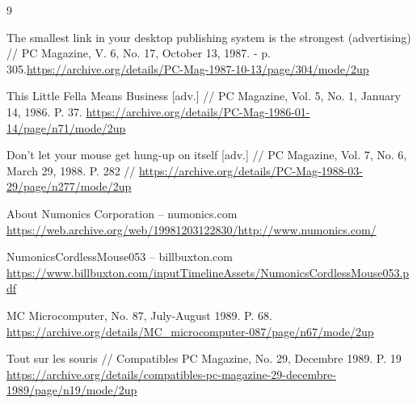 \documentclass[11pt, a4paper]{article}
\begin{document}
\begin{thebibliography}{9}

 The smallest link in your desktop publishing system is the strongest (advertising) // PC Magazine, V. 6, No. 17, October  13, 1987. - p. 305.\url{https://archive.org/details/PC-Mag-1987-10-13/page/304/mode/2up}

 This Little Fella Means Business [adv.] // PC Magazine, Vol. 5, No. 1, January 14, 1986. P. 37. \url{https://archive.org/details/PC-Mag-1986-01-14/page/n71/mode/2up}

 Don't let your mouse get hung-up on itself [adv.] // PC Magazine, Vol. 7, No. 6, March 29, 1988. P. 282 // \url{https://archive.org/details/PC-Mag-1988-03-29/page/n277/mode/2up}

 About Numonics Corporation -- numonics.com \url{https://web.archive.org/web/19981203122830/http://www.numonics.com/}

 NumonicsCordlessMouse053 -- billbuxton.com \url{https://www.billbuxton.com/inputTimelineAssets/NumonicsCordlessMouse053.pdf}

 MC Microcomputer, No. 87, July-August 1989. P. 68. \url{https://archive.org/details/MC_microcomputer-087/page/n67/mode/2up}

 Tout sur les souris // Compatibles PC Magazine, No. 29, Decembre 1989. P. 19 \url{https://archive.org/details/compatibles-pc-magazine-29-decembre-1989/page/n19/mode/2up}







\end{thebibliography}
\end{document}
